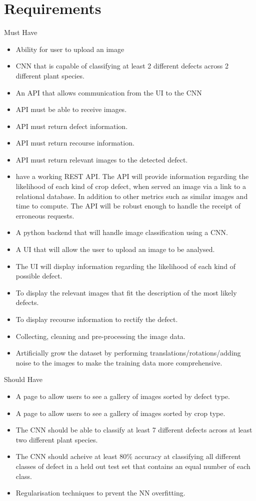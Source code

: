 \section{Requirements}
\item Must Have
\begin{itemize}
  \item Ability for user to upload an image
  \item CNN that is capable of classifying at least 2 different defects
    across 2 different plant species.
  \item An API that allows communication from the UI to the CNN
  \item API must be able to receive images.
  \item API must return defect information.
  \item API must return recourse information.
  \item API must return relevant images to the detected defect.
	\item have a working REST API. The API will provide information regarding the likelihood of each kind of crop defect, when served an image via a link to a relational database. In addition to other metrics such as similar images and time to compute. The API will be robust enough to handle the receipt of erroneous requests.
	\item A python backend that will handle image classification using a CNN.
	\item A UI that will allow the user to upload an image to be analysed.
	\item The UI will display information regarding the likelihood of each kind of possible defect.
	\item To display the relevant images that fit the description of the most likely defects.
	\item To display recourse information to rectify the defect.
	\item Collecting, cleaning and pre-processing the image data.
  \item Artificially grow the dataset by performing translations/rotations/adding noise to the images to make the training data more comprehensive.
\end{itemize}
\item Should Have
\begin{itemize}
  \item A page to allow users to see a gallery of images sorted by
    defect type.
  \item A page to allow users to see a gallery of images sorted by
    crop type.
  \item The CNN should be able to classify at least 7 different defects across at least two different plant species.
  \item The CNN should acheive at least 80\% accuracy at classifying all different classes of defect in a held out test set that contains an equal number of each class.
	\item Regularisation techniques to prvent the NN overfitting.
\end{itemize}
